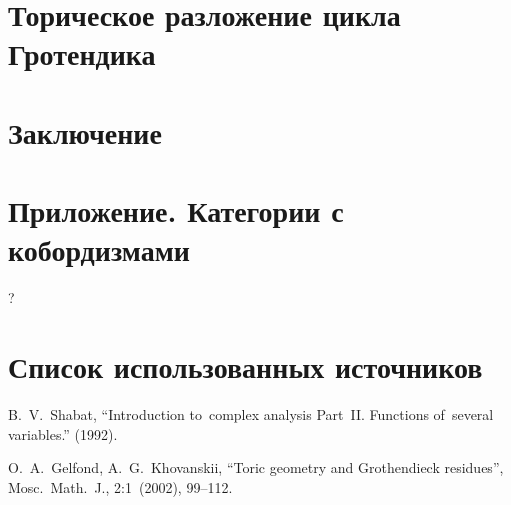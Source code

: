 \documentclass{article}
\begin{document}
\section{Торическое разложение цикла Гротендика}

\section{Заключение}

\pagebreak

\titleformat{\section}{\centering\normalfont\Large\bfseries}{}{0em}{}
\section{Приложение. Категории с кобордизмами}

?

\pagebreak

\section{Список использованных источников}

\begin{thebibliography}{9}

 B.~V.~Shabat, “Introduction to~complex analysis Part~II. Functions of~several variables.” (1992).

 O.~A.~Gelfond, A.~G.~Khovanskii, “Toric geometry and Grothendieck residues”, Mosc.~Math.~J., 2:1~(2002), 99–112.

\end{thebibliography}
\end{document}
